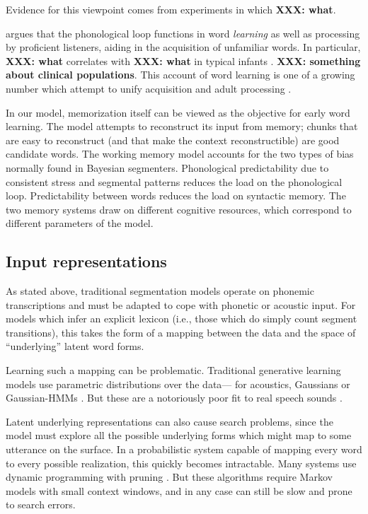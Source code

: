 \documentclass[11pt,letterpaper]{article}
\newcommand{\xxx}[1]{\textbf{\color{red}XXX: #1}}
\begin{document}
Evidence for this viewpoint comes from experiments in which
\xxx{what}.

 argues that the phonological loop functions in word
\textit{learning} as well as processing by proficient listeners,
aiding in the acquisition of unfamiliar words. In particular,
\xxx{what} correlates with \xxx{what} in typical infants
\cite{xxx}. \xxx{something about clinical populations}. This account
of word learning is one of a growing number which attempt to unify
acquisition and adult processing \cite{mcmurray}.

In our model, memorization itself can be viewed as the objective for
early word learning. The model attempts to reconstruct its input from
memory; chunks that are easy to reconstruct (and that make the context
reconstructible) are good candidate words. The working memory model
accounts for the two types of bias normally found in Bayesian
segmenters. Phonological predictability due to consistent stress
\cite{Boerschinger} and segmental patterns \cite{Goldwater} reduces
the load on the phonological loop.  Predictability between words
reduces the load on syntactic memory. The two memory systems draw on
different cognitive resources, which correspond to different
parameters of the model.

\subsection{Input representations}
\label{sub-representations}

As stated above, traditional segmentation models operate on phonemic
transcriptions and must be adapted to cope with phonetic or acoustic
input. For models which infer an explicit lexicon (i.e., those which
do simply count segment transitions), this takes the form of a mapping
between the data and the space of ``underlying'' latent word
forms.

Learning such a mapping can be problematic. Traditional generative
learning models use parametric distributions over the data--- for
acoustics, Gaussians \cite{Feldman,Elsner} or Gaussian-HMMs
\cite{Lee}. But these are a notoriously poor fit to real speech sounds
\cite{Glass?}.

Latent underlying representations can also cause search problems,
since the model must explore all the possible underlying forms which
might map to some utterance on the surface. In a probabilistic system
capable of mapping every word to every possible realization, this
quickly becomes intractable. Many systems use dynamic programming
\cite{Mochihashi,Neubig} with pruning \cite{vanGael}. But these
algorithms require Markov models with small context windows, and in
any case can still be slow and prone to search errors.
\end{document}
